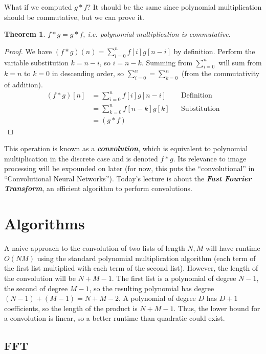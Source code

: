 \documentclass[11pt, oneside]{article}
\newcommand{\emphasis}[1]{\textbf{\textit{#1}}}
\theoremstyle{plain}
\newtheorem{theorem}{Theorem}[section]
\theoremstyle{definition}
\begin{document}
What if we computed \( g * f \)? It should be the same since
polynomial multiplication should be commutative, but we can prove it.
\begin{theorem}
    \( f * g = g * f \), i.e. polynomial multiplication is commutative.
\end{theorem}
\begin{proof}
    We have \( (f * g)(n) = \sum^n_{i = 0} f[i]g[n - i] \) by definition.
Perform the variable substitution \( k = n - i \), so \( i = n - k \).
Summing from \( \sum^n_{i = 0} \) will sum from \( k = n \) to \( k = 0 \)
in descending order, so \( \sum^n_{i = 0} = \sum^n_{k = 0} \)
(from the commutativity of addition).
\begin{align*}
    (f * g)[n] &= \sum^n_{i = 0} f[i]g[n - i] && \text{Definition} \\
               &= \sum^n_{k = 0} f[n - k]g[k] && \text{Substitution} \\
               &= (g * f)
\end{align*}
\end{proof}

This operation is known as a \emphasis{convolution}, which is equivalent to
polynomial multiplication in the discrete case and is denoted \( f * g \).
Its relevance to image processing will be expounded on later
(for now, this puts the \enquote{convolutional}
in \enquote{Convolutional Neural Networks}).
Today's lecture is about the \emphasis{Fast Fourier Transform}, an efficient
algorithm to perform convolutions.

\section{Algorithms}
A naive approach to the convolution of two lists of length \( N, M \) will have
runtime \( O(NM) \) using the standard polynomial multiplication algorithm
(each term of the first list multiplied with each term of the second list).
However, the length of the convolution will be \( N + M - 1 \).
The first list is a polynomial of degree \( N - 1 \),
the second of degree \( M - 1 \), so the resulting polynomial has degree 
\( (N - 1) + (M - 1) = N + M - 2 \). A polynomial of degree \( D \)
has \( D + 1 \) coefficients, so the length of the product is \( N + M - 1 \).
Thus, the lower bound for a convolution is linear,
so a better runtime than quadratic could exist. 

\subsection{FFT}
\end{document}
